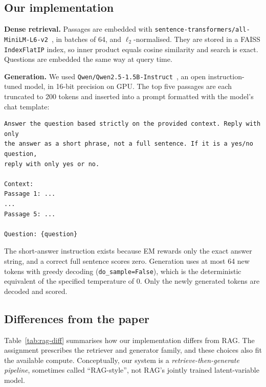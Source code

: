 \documentclass[11pt,a4paper]{article}
\begin{document}
\subsection{Our implementation}

\textbf{Dense retrieval.} Passages are embedded with \texttt{sentence-transformers/all-MiniLM-L6-v2}~\cite{sbert}, in batches of 64, and $\ell_2$-normalised. They are stored in a FAISS \texttt{IndexFlatIP} index, so inner product equals cosine similarity and search is exact. Questions are embedded the same way at query time.

\textbf{Generation.} We used \texttt{Qwen/Qwen2.5-1.5B-Instruct}~\cite{qwen}, an open instruction-tuned model, in 16-bit precision on GPU. The top five passages are each truncated to 200 tokens and inserted into a prompt formatted with the model's chat template:

\begin{lstlisting}
Answer the question based strictly on the provided context. Reply with only
the answer as a short phrase, not a full sentence. If it is a yes/no question,
reply with only yes or no.

Context:
Passage 1: ...
...
Passage 5: ...

Question: {question}
\end{lstlisting}

The short-answer instruction exists because EM rewards only the exact answer string, and a correct full sentence scores zero. Generation uses at most 64 new tokens with greedy decoding (\texttt{do\_sample=False}), which is the deterministic equivalent of the specified temperature of 0. Only the newly generated tokens are decoded and scored.

\subsection{Differences from the paper}
Table~\ref{tab:rag-diff} summarises how our implementation differs from RAG. The assignment prescribes the retriever and generator family, and these choices also fit the available compute. Conceptually, our system is a \emph{retrieve-then-generate pipeline}, sometimes called ``RAG-style'', not RAG's jointly trained latent-variable model.
\end{document}
